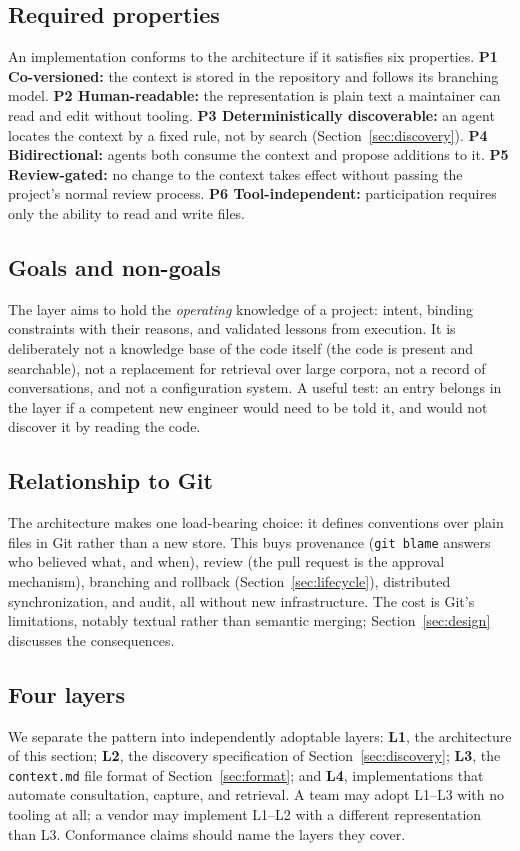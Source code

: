\documentclass[sigconf,nonacm]{acmart}
\newcommand{\ctx}{\texttt{context.md}}
\begin{document}
\subsection{Required properties}
An implementation conforms to the architecture if it satisfies six properties.
\textbf{P1 Co-versioned:} the context is stored in the repository and follows its
branching model. \textbf{P2 Human-readable:} the representation is plain text a
maintainer can read and edit without tooling. \textbf{P3 Deterministically
discoverable:} an agent locates the context by a fixed rule, not by search
(Section~\ref{sec:discovery}). \textbf{P4 Bidirectional:} agents both consume the
context and propose additions to it. \textbf{P5 Review-gated:} no change to the
context takes effect without passing the project's normal review process.
\textbf{P6 Tool-independent:} participation requires only the ability to read and
write files.

\subsection{Goals and non-goals}
The layer aims to hold the \emph{operating} knowledge of a project: intent,
binding constraints with their reasons, and validated lessons from execution. It
is deliberately not a knowledge base of the code itself (the code is present and
searchable), not a replacement for retrieval over large corpora, not a record of
conversations, and not a configuration system. A useful test: an entry belongs in
the layer if a competent new engineer would need to be told it, and would not
discover it by reading the code.

\subsection{Relationship to Git}
The architecture makes one load-bearing choice: it defines conventions over plain
files in Git rather than a new store. This buys provenance (\texttt{git blame}
answers who believed what, and when), review (the pull request is the approval
mechanism), branching and rollback (Section~\ref{sec:lifecycle}), distributed
synchronization, and audit, all without new infrastructure. The cost is Git's
limitations, notably textual rather than semantic merging;
Section~\ref{sec:design} discusses the consequences.

\subsection{Four layers}
We separate the pattern into independently adoptable layers: \textbf{L1}, the
architecture of this section; \textbf{L2}, the discovery specification of
Section~\ref{sec:discovery}; \textbf{L3}, the \ctx{} file format of
Section~\ref{sec:format}; and \textbf{L4}, implementations that automate
consultation, capture, and retrieval. A team may adopt L1--L3 with no tooling at
all; a vendor may implement L1--L2 with a different representation than L3.
Conformance claims should name the layers they cover.
\end{document}

